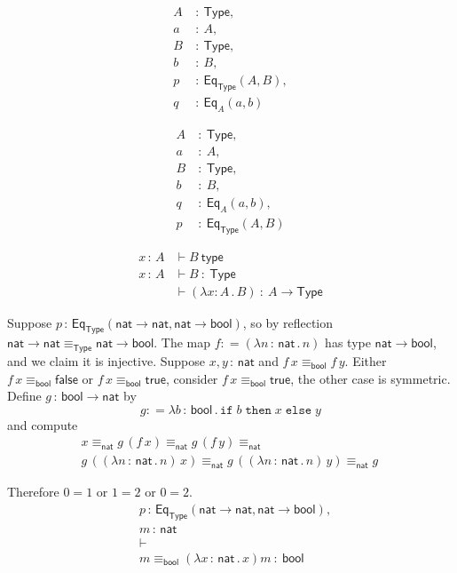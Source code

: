 \documentclass{article}
\newcommand{\defeq}{\mathrel{{:}{=}}}
\newcommand{\Type}{\mathsf{Type}}
\newcommand{\lam}[1]{\lambda #1 \,.\,}
\newcommand{\is}{\ :\ }
\newcommand{\isType}{\ \mathsf{type}}
\newcommand{\of}{\,{:}\,}
\newcommand{\Eq}[2]{\mathsf{Eq}_{#1}(#2)}
\newcommand{\bool}{\mathsf{bool}}
\newcommand{\true}{\mathsf{true}}
\newcommand{\false}{\mathsf{false}}
\newcommand{\nat}{\mathsf{nat}}
\begin{document}

\begin{align*}
  A &\is \Type, \\
  a &\is A, \\
  B &\is \Type, \\
  b &\is B, \\
  p &\is \Eq{\Type}{A,B}, \\
  q &\is \Eq{A}{a,b}
\end{align*}

\begin{align*}
  A &\is \Type, \\
  a &\is A, \\
  B &\is \Type, \\
  b &\is B, \\
  q &\is \Eq{A}{a,b}, \\
  p &\is \Eq{\Type}{A,B}
\end{align*}


\begin{align*}
  x \of A &\vdash B \isType \\
  x \of A &\vdash B \is \Type \\
          &\vdash (\lam{x : A} B) \is A \to \Type
\end{align*}


\newpage
\noindent
Suppose $p \of \Eq{\Type}{\nat \to \nat, \nat \to \bool}$, so by
reflection $\nat \to \nat \equiv_\Type \nat \to \bool$.
The map $f \defeq (\lam{n \of \nat} n)$ has type $\nat \to \bool$,
and we claim it is injective. Suppose $x, y \of \nat$ and $f\, x \equiv_\bool f \, y$.
Either $f \, x \equiv_\bool \false$ or $f \, x \equiv_\bool \true$, consider
$f \, x \equiv_\bool \true$, the other case is symmetric.
Define $g \of \bool \to \nat$ by
%
$$g \defeq \lam{b \of \bool}
  \mathtt{if}\; b \; \mathtt{then} \; x \; \mathtt{else} \; y$$
%
and compute
%
\begin{multline*}
  x \equiv_\nat
  g \, (f \, x) \equiv_\nat
  g \, (f \, y) \equiv_\nat \\
  g \, ((\lam{n \of \nat} n)\, x) \equiv_\nat
  g \, ((\lam{n \of \nat} n)\, y) \equiv_\nat
  g \, 
\end{multline*}




Therefore $0 = 1$ or $1 = 2$ or $0 = 2$.\\


\begin{align*}
  & p \of \Eq{\Type}{\nat \to \nat, \nat \to \bool},\\
  & m \of \nat \\
  &{\vdash} \\
  & m \equiv_\bool (\lam{x \of \nat} x) m \is \bool
\end{align*}
\end{document}
